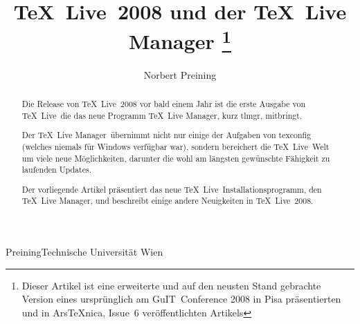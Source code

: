 %
%
%

\newcommand{\tl}{\TeX~Live}
\title{\tl~2008 und der \TeX\ Live Manager%
  \thanks{
	  Dieser Artikel ist eine erweiterte und auf den neusten Stand
  	  gebrachte Version eines ursprünglich am GuIT\ Conference 2008 in 
	  Pisa präsentierten und in Ars\TeX nica, Issue~6 veröffentlichten
	  Artikels}}

\author{Norbert Preining}
\address{Norbert}{Preining}{Technische Universität Wien\\
}

\maketitle

\DefineShortVerb{\|}

\newcommand{\tlmgr}{\TeX~Live Manager}

\newcommand{\tlpsrc}{\texttt{tlpsrc}}
\newcommand{\tlpsrcs}{\tlpsrc{}s}
\newcommand{\tlpobj}{\texttt{tlpobj}}
\newcommand{\tlpobjs}{\tlpobj{}s}
\newcommand{\tlpdb}{\texttt{tlpdb}}
\newcommand{\tlpdbs}{\tlpdb{}s}
\newcommand{\pl}{Perl}
\newcommand{\gs}{Ghostscript}
\newcommand{\tlu}{\texttt{texlua}}
\newcommand{\kpse}{Kpathsea}
\newcommand{\XeTeX}{Xe\TeX}
\newcommand{\acro}[1]{\textsc{\MakeLowercase{#1}}}
\newcommand{\ctan}{\acro{CTAN}}
\newcommand{\cmd}[1]{\textsf{#1}}
\newcommand{\button}[1]{\textsf{#1}}
\newcommand{\var}[1]{\textsl{#1}}


\begin{abstract}
Die Release von \tl~2008 vor bald einem Jahr ist die erste Ausgabe
von \tl\ die das neue Programm \tlmgr, kurz tlmgr, mitbringt.

Der \tlmgr\ übernimmt nicht nur einige der Aufgaben von texconfig
(welches niemals für Windows verfügbar war), sondern bereichert die
\tl\ Welt um viele neue Möglichkeiten, darunter die wohl am längsten
gewünschte Fähigkeit zu laufenden Updates.

Der vorliegende Artikel präsentiert das neue \tl\ Installationsprogramm, den
\tlmgr, und beschreibt einige andere Neuigkeiten in \tl~2008.
\end{abstract}


